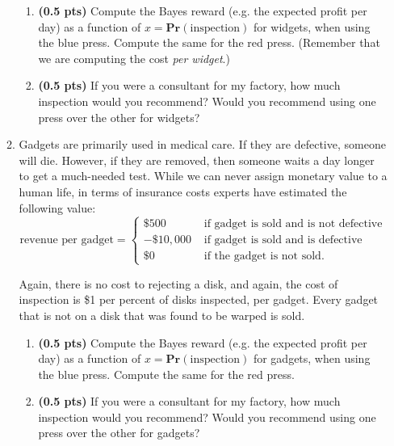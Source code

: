 \documentclass{article}
\newcommand{\pr}{\mathbf{Pr}}
\newcommand{\showpoints}[1]{\textbf{(#1)}}
\begin{document}
\begin{enumerate}
\begin{enumerate}
\begin{enumerate}
\item \showpoints{0.5 pts} Compute the Bayes reward (e.g. the expected profit per day) as a function of $x = \pr(\text{inspection})$ for widgets, when using the blue press. Compute the same for the red press. (Remember that we are computing the cost \emph{per widget}.)




\item \showpoints{0.5 pts} If you were a consultant for my factory, how much inspection would you recommend? Would you recommend using one press over the other for widgets?


 
\end{enumerate}



\item Gadgets are primarily used in medical care. If they are defective, someone will die. However, if they are removed, then someone waits a day longer to get a much-needed test.  While we can never assign monetary value to a human life, in terms of insurance costs experts have estimated the following value:
\[
\text{revenue per gadget} = \begin{cases}
\$500  & \text{ if gadget is sold and is not defective}\\
-\$10,000 & \text{ if gadget is sold and is defective}\\
\$0 & \text{ if the gadget is not sold.}
\end{cases}
\]


Again, there is no cost to rejecting a disk, and again, the cost of inspection is \$1 per percent of disks inspected, per gadget.
 Every gadget that is not on a disk that was found to be warped is sold.

\begin{enumerate}
\item \showpoints{0.5 pts} Compute the Bayes reward (e.g. the expected profit per day) as a function of $x = \pr(\text{inspection})$ for gadgets, when using the blue press. Compute the same for the red press. 




\item \showpoints{0.5 pts} If you were a consultant for my factory, how much inspection would you recommend? Would you recommend using one press over the other for gadgets?


\end{enumerate}



\end{enumerate}
\end{enumerate}
\end{document}
